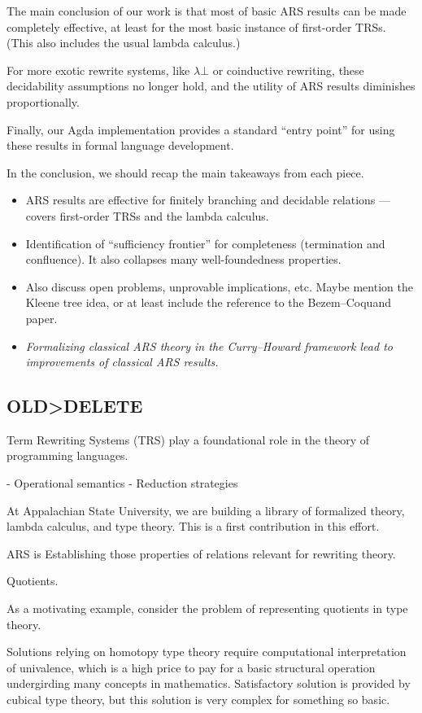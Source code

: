The main conclusion of our work is that most of basic ARS results can be made completely effective, at least for the most basic instance of first-order TRSs.
(This also includes the usual lambda calculus.)

For more exotic rewrite systems, like $\lambda \bot$ or coinductive rewriting,
these decidability assumptions no longer hold, and the utility of ARS results diminishes proportionally.

Finally, our Agda implementation provides a standard ``entry point'' for using these results in formal language development.

{ \color{gray}
In the conclusion, we should recap the main takeaways from each piece.
\begin{itemize}
  \item ARS results are effective for finitely branching and decidable relations
  --- covers first-order TRSs and the lambda calculus.
  \item Identification of ``sufficiency frontier'' for completeness (termination and confluence).
  It also collapses many well-foundedness properties.
  \item Also discuss open problems, unprovable implications, etc.
  Maybe mention the Kleene tree idea, or at least include the reference to the Bezem--Coquand paper.
  \item \emph{Formalizing classical ARS theory in the Curry--Howard framework
  lead to improvements of classical ARS results.}
\end{itemize}
}


\subsection{OLD>DELETE}

Term Rewriting Systems (TRS) play a foundational role in the theory of
programming languages.

- Operational semantics
- Reduction strategies

At Appalachian State University, we are building a library of formalized theory,
lambda calculus, and type theory. This is a first contribution in this effort.

ARS is Establishing those properties of relations relevant for rewriting theory.

Quotients.

As a motivating example, consider the problem of representing quotients in type theory.

Solutions relying on homotopy type theory require computational interpretation
of univalence, which is a high price to pay for a basic structural operation
undergirding many concepts in mathematics.
Satisfactory solution is provided by cubical type theory, but this solution
is very complex for something so basic.


